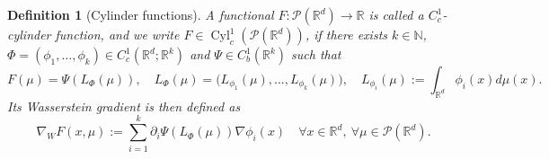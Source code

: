 \documentclass[10pt,leqno]{amsart}
\numberwithin{equation}{section}
\newtheorem{df}[teorema]{Definition}
\newcommand{\R}{\mathbb{R}}
\newcommand{\N}{\mathbb{N}}
\newcommand{\PP}{\mathcal{P}}
\begin{document}
\begin{df}[Cylinder functions]\label{def: cyl functions}
    A functional $F:\PP(\R^d)\to\R$ is called a $C^1_c$-cylinder function, and we write $F\in \operatorname{Cyl}_c^1(\PP(\R^d))$, if there exists $k\in \N$, $\Phi = (\phi_1,\dots,\phi_k)\in C^1_c(\R^d;\R^k)$ and $\Psi\in C^1_b(\R^k)$ such that 
    \begin{equation}\label{cyl functions}
        F(\mu) = \Psi\left( L_\Phi(\mu) \right), \quad L_\Phi(\mu) =  \big(L_{\phi_1}(\mu) ,\dots , L_{\phi_k}(\mu)\big), \quad  L_{\phi_i}(\mu) := \int_{\R^d} \phi_i(x) d\mu(x).
    \end{equation}
    Its Wasserstein gradient is then defined as 
    \begin{equation}\label{wass gradient cyl}
        \nabla_W F(x,\mu):= \sum_{i=1}^k \partial_{i}\Psi\left( L_{\Phi}(\mu)\right) \nabla \phi_i(x) \quad \forall x\in \R^d, \ \forall\mu \in \PP(\R^d).
    \end{equation} 
\end{df}
\end{document}

